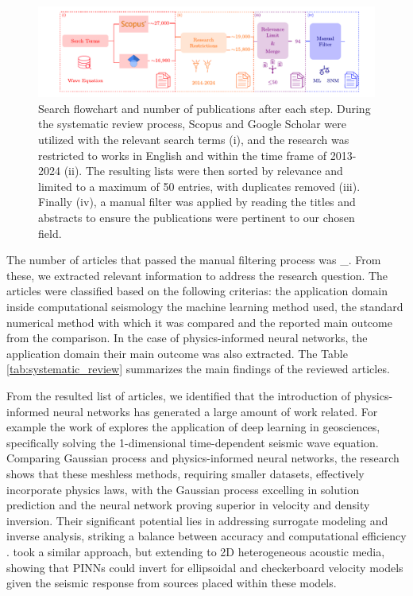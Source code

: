\documentclass[11pt,twoside]{article}
\begin{document}
\begin{figure}[h]
    \includegraphics[width=1.0\textwidth]{figs/scheme_systematic_review.pdf}
\caption{Search flowchart and number of publications after each step. During the systematic review process, 
Scopus and Google Scholar were utilized with the relevant search terms (i), and the research was restricted to works 
in English and within the time frame of 2013-2024 (ii). The resulting lists were then sorted by relevance and limited 
to a maximum of 50 entries, with duplicates removed (iii). Finally (iv), a manual filter was applied by reading the 
titles and abstracts to ensure the publications were pertinent to our chosen field.}\label{fig:scheme_systematic_review}
\end{figure}

The number of articles that passed the manual filtering process was \_. From these, we extracted relevant information to 
address the research question. The articles were classified based on the following criterias: the application domain 
inside computational seismology the machine learning method used, the standard numerical method with which it was 
compared and the reported main outcome from the comparison. In the case of physics-informed neural networks, 
the application domain their main outcome was also extracted. The Table \ref{tab:systematic_review} summarizes 
the main findings of the reviewed articles. 

From the resulted list of articles, we identified that the introduction of physics-informed neural 
networks has generated a large amount of work related. For example the work of 
 explores the application of deep learning in geosciences, 
specifically solving the 1-dimensional time-dependent seismic wave equation. Comparing Gaussian process 
and physics-informed neural networks, the research shows that these meshless methods, requiring 
smaller datasets, effectively incorporate physics laws, with the Gaussian process excelling in 
solution prediction and the neural network proving superior in velocity and density inversion. 
Their significant potential lies in addressing surrogate modeling and inverse analysis, 
striking a balance between accuracy and computational efficiency \citep{Song2022}. 
 took a similar  approach, but extending to 2D heterogeneous acoustic 
media, showing that PINNs could invert for ellipsoidal and checkerboard velocity models 
given the seismic response from sources placed within these models.
\end{document}
